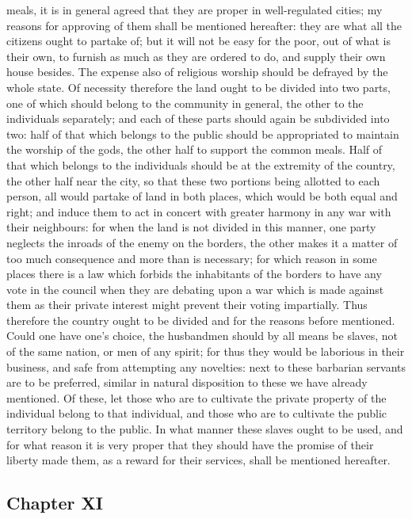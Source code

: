 \documentclass[12pt]{article}
\begin{document}
meals, it is in general agreed that they are proper in well-regulated cities; my reasons for approving of them shall be mentioned hereafter: they are what all the citizens ought to partake of; but it will not be easy for the poor, out of what is their own, to furnish as much as they are ordered to do, and supply their own house besides. The expense also of religious worship should be defrayed by the whole state. Of necessity therefore the land ought to be divided into two parts, one of which should belong to the community in general, the other to the individuals separately; and each of these parts should again be subdivided into two: half of that which belongs to the public should be appropriated to maintain the worship of the gods, the other half to support the common meals. Half of that which belongs to the individuals should be at the extremity of the country, the other half near the city, so that these two portions being allotted to each person, all would partake of land in both places, which would be both equal and right; and induce them to act in concert with greater harmony in any war with their neighbours: for when the land is not divided in this manner, one party neglects the inroads of the enemy on the borders, the other makes it a matter of too much consequence and more than is necessary; for which reason in some places there is a law which forbids the inhabitants of the borders to have any vote in the council when they are debating upon a war which is made against them as their private interest might prevent their voting impartially. Thus therefore the country ought to be divided and for the reasons before mentioned. Could one have one's choice, the husbandmen should by all means be slaves, not of the same nation, or men of any spirit; for thus they would be laborious in their business, and safe from attempting any novelties: next to these barbarian servants are to be preferred, similar in natural disposition to these we have already mentioned. Of these, let those who are to cultivate the private property of the individual belong to that individual, and those who are to cultivate the public territory belong to the public. In what manner these slaves ought to be used, and for what reason it is very proper that they should have the promise of their liberty made them, as a reward for their services, shall be mentioned hereafter.

\subsection*{Chapter XI}
\end{document}
